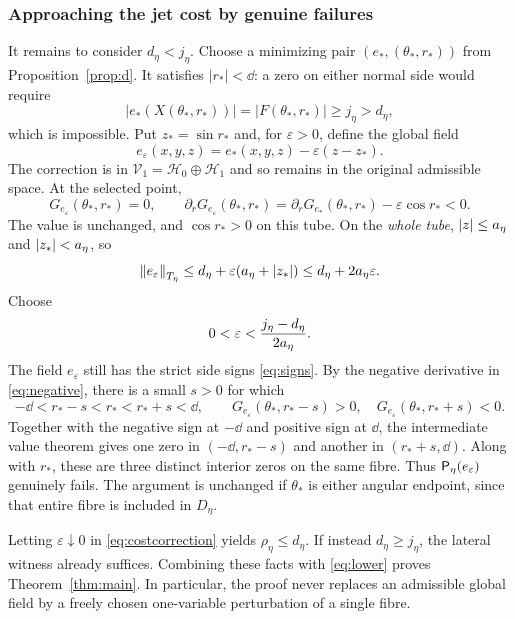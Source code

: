 \documentclass[11pt,a4paper]{article}
\begin{document}
\subsubsection{Approaching the jet cost by genuine failures}
It remains to consider $d_\eta<j_\eta$. Choose a minimizing pair
$(e_*,(\theta_*,r_*))$ from Proposition~\ref{prop:d}. It satisfies
$|r_*|<\dd$: a zero on either normal side would require
\[
 |e_*(X(\theta_*,r_*))|=|F(\theta_*,r_*)|\ge j_\eta>d_\eta,
\]
which is impossible. Put $z_* = \sin r_*$ and, for $\varepsilon>0$,
define the global field
\begin{equation}\label{eq:correction}
 e_\varepsilon(x,y,z)=e_*(x,y,z)-\varepsilon(z-z_*).
\end{equation}
The correction is in $\mathcal V_1=\mathcal H_0\oplus\mathcal H_1$
and so remains in the original admissible space. At the selected point,
\begin{equation}\label{eq:negative}
 G_{e_\varepsilon}(\theta_*,r_*)=0,\qquad
 \partial_rG_{e_\varepsilon}(\theta_*,r_*)
 =\partial_rG_{e_*}(\theta_*,r_*)-\varepsilon\cos r_*<0.
\end{equation}
The value is unchanged, and $\cos r_*>0$ on this tube. On the
\emph{whole tube}, $|z|\le a_\eta$ and $|z_*|<a_\eta$, so
\begin{equation}\label{eq:costcorrection}
 \left\lVert e_\varepsilon\right\rVert_{T_\eta}
 \le d_\eta+\varepsilon(a_\eta+|z_*|)
 \le d_\eta+2a_\eta\varepsilon.
\end{equation}
Choose
\begin{equation}\label{eq:eps}
 0<\varepsilon<\frac{j_\eta-d_\eta}{2a_\eta}.
\end{equation}
The field $e_\varepsilon$ still has the strict side signs
\eqref{eq:signs}. By the negative derivative in \eqref{eq:negative},
there is a small $s>0$ for which
\[
 -\dd<r_*-s<r_*<r_*+s<\dd,\qquad
 G_{e_\varepsilon}(\theta_*,r_*-s)>0,
 \quad G_{e_\varepsilon}(\theta_*,r_*+s)<0.
\]
Together with the negative sign at $-\dd$ and positive sign at
$\dd$, the intermediate value theorem gives one zero in
$(-\dd,r_*-s)$ and another in $(r_*+s,\dd)$. Along with $r_*$,
these are three distinct interior zeros on the same fibre. Thus
$\mathsf P_\eta(e_\varepsilon)$ genuinely fails. The argument is unchanged
if $\theta_*$ is either angular endpoint, since that entire fibre is
included in $D_\eta$.

Letting $\varepsilon\downarrow0$ in \eqref{eq:costcorrection} yields
$\rho_\eta\le d_\eta$. If instead $d_\eta\ge j_\eta$, the
lateral witness already suffices. Combining these facts with
\eqref{eq:lower} proves Theorem~\ref{thm:main}. In particular, the
proof never replaces an admissible global field by a freely chosen
one-variable perturbation of a single fibre.
\end{document}
